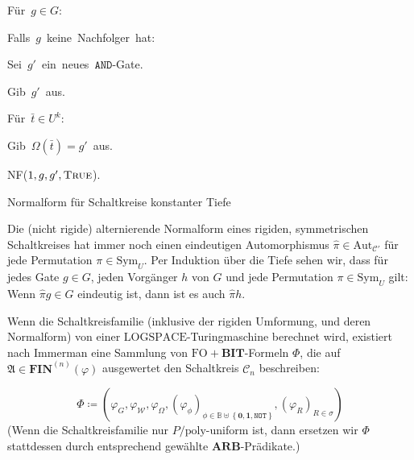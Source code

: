 \begin{algorithm}
\begin{lyxcode}
\begin{lyxcode}
Für~$g\in G$:~

\begin{lyxcode}
Falls~$g$~keine~Nachfolger~hat:~

\begin{lyxcode}
Sei~$g'$~ein~neues~$\mathtt{AND}$-Gate.

Gib~$g'$~aus.

Für~$\bar{t}\in U^{k}$:~

\begin{lyxcode}
Gib~$\Omega\left(\bar{t}\right)=g'$~aus.
\end{lyxcode}
NF($1,g,g',\textsc{True}$).
\end{lyxcode}
\end{lyxcode}
\end{lyxcode}
\end{lyxcode}
\caption{\label{alg:ac0-normal-form}Normalform für Schaltkreise konstanter
Tiefe}
\end{algorithm}

Die (nicht rigide) alternierende Normalform eines rigiden, symmetrischen
Schaltkreises hat immer noch einen eindeutigen Automorphismus $\hat{\pi}\in\mathrm{Aut}_{\mathcal{C}'}$
für jede Permutation $\pi\in\mathrm{Sym}_{U}$. Per Induktion über
die Tiefe sehen wir, dass für jedes Gate $g\in G$, jeden Vorgänger
$h$ von $G$ und jede Permutation $\pi\in\mathrm{Sym}_{U}$ gilt:
Wenn $\hat{\pi}g\in G$ eindeutig ist, dann ist es auch $\hat{\pi}h$.

Wenn die Schaltkreisfamilie (inklusive der rigiden Umformung, und
deren Normalform) von einer $\mathrm{LOGSPACE}$-Turingmaschine berechnet
wird, existiert nach Immerman\cite{immerman2012descriptive} eine
Sammlung von $\mathrm{FO}+\mathbf{BIT}$-Formeln $\Phi$, die auf
$\mathfrak{A}\in\mathbf{FIN}^{\left(n\right)}\left(\varphi\right)$
ausgewertet den Schaltkreis $\mathcal{C}_{n}$ beschreiben:

\[
\Phi\coloneqq\left(\varphi_{G},\varphi_{\mathcal{W}},\varphi_{\Omega},\left(\varphi_{\phi}\right)_{\phi\in\mathbb{B}\uplus\left\{ \mathbf{0},\mathbf{1},\mathtt{NOT}\right\} },\left(\varphi_{R}\right)_{R\in\sigma}\right)
\]
(Wenn die Schaltkreisfamilie nur $P/\mathrm{poly}$-uniform ist, dann
ersetzen wir $\Phi$ stattdessen durch entsprechend gewählte $\mathbf{ARB}$-Prädikate.)


